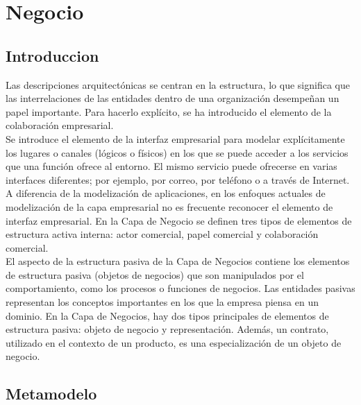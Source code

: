\chapter{Negocio}
\section{Introduccion}
Las descripciones arquitectónicas se centran en la estructura, lo que significa que las interrelaciones de las entidades dentro de una organización desempeñan un papel importante. Para hacerlo explícito, se ha introducido el elemento de la colaboración empresarial.\\

Se introduce el elemento de la interfaz empresarial para modelar explícitamente los lugares o canales (lógicos o físicos) en los que se puede acceder a los servicios que una función ofrece al entorno. El mismo servicio puede ofrecerse en varias interfaces diferentes; por ejemplo, por correo, por teléfono o a través de Internet. A diferencia de la modelización de aplicaciones, en los enfoques actuales de modelización de la capa empresarial no es frecuente reconocer el elemento de interfaz empresarial.
En la Capa de Negocio se definen tres tipos de elementos de estructura activa interna: actor comercial, papel comercial y colaboración comercial.\\

El aspecto de la estructura pasiva de la Capa de Negocios contiene los elementos de estructura pasiva (objetos de negocios) que son manipulados por el comportamiento, como los procesos o funciones de negocios. Las entidades pasivas representan los conceptos importantes en los que la empresa piensa en un dominio.
En la Capa de Negocios, hay dos tipos principales de elementos de estructura pasiva: objeto de negocio y representación. Además, un contrato, utilizado en el contexto de un producto, es una especialización de un objeto de negocio.

\newpage
\section{Metamodelo}

